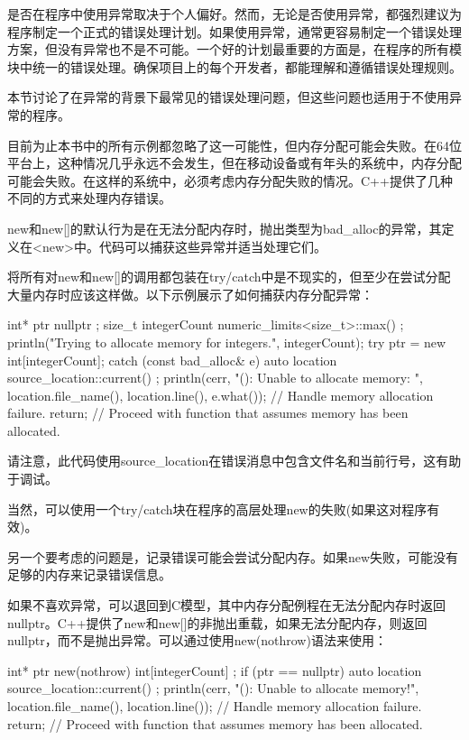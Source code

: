 
是否在程序中使用异常取决于个人偏好。然而，无论是否使用异常，都强烈建议为程序制定一个正式的错误处理计划。如果使用异常，通常更容易制定一个错误处理方案，但没有异常也不是不可能。一个好的计划最重要的方面是，在程序的所有模块中统一的错误处理。确保项目上的每个开发者，都能理解和遵循错误处理规则。

本节讨论了在异常的背景下最常见的错误处理问题，但这些问题也适用于不使用异常的程序。


目前为止本书中的所有示例都忽略了这一可能性，但内存分配可能会失败。在64位平台上，这种情况几乎永远不会发生，但在移动设备或有年头的系统中，内存分配可能会失败。在这样的系统中，必须考虑内存分配失败的情况。C++提供了几种不同的方式来处理内存错误。

new和new[]的默认行为是在无法分配内存时，抛出类型为bad\_alloc的异常，其定义在<new>中。代码可以捕获这些异常并适当处理它们。

将所有对new和new[]的调用都包装在try/catch中是不现实的，但至少在尝试分配大量内存时应该这样做。以下示例展示了如何捕获内存分配异常：

\begin{cpp}
int* ptr { nullptr };
size_t integerCount { numeric_limits<size_t>::max() };
println("Trying to allocate memory for {} integers.", integerCount);
try {
    ptr = new int[integerCount];
} catch (const bad_alloc& e) {
    auto location { source_location::current() };
    println(cerr, "{}({}): Unable to allocate memory: {}",
        location.file_name(), location.line(), e.what());
    // Handle memory allocation failure.
    return;
}
// Proceed with function that assumes memory has been allocated.
\end{cpp}

请注意，此代码使用source\_location在错误消息中包含文件名和当前行号，这有助于调试。

当然，可以使用一个try/catch块在程序的高层处理new的失败(如果这对程序有效)。

另一个要考虑的问题是，记录错误可能会尝试分配内存。如果new失败，可能没有足够的内存来记录错误信息。


如果不喜欢异常，可以退回到C模型，其中内存分配例程在无法分配内存时返回nullptr。C++提供了new和new[]的非抛出重载，如果无法分配内存，则返回nullptr，而不是抛出异常。可以通过使用new(nothrow)语法来使用：

\begin{cpp}
int* ptr { new(nothrow) int[integerCount] };
if (ptr == nullptr) {
    auto location { source_location::current() };
    println(cerr, "{}({}): Unable to allocate memory!",
        location.file_name(), location.line());
    // Handle memory allocation failure.
    return;
}
// Proceed with function that assumes memory has been allocated.
\end{cpp}

